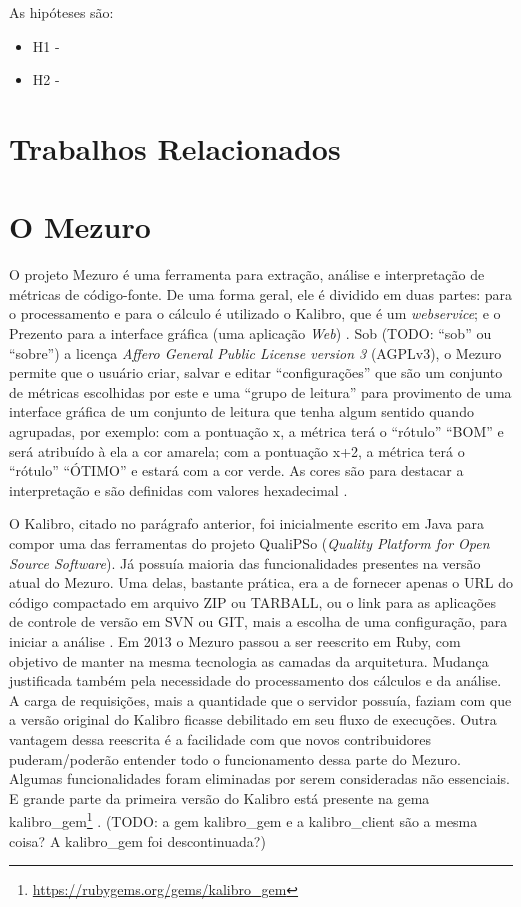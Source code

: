 As hipóteses são:

\begin{itemize}
  \item H1 - 
  \item H2 - 
\end{itemize}


\section{Trabalhos Relacionados}

\section{O Mezuro}

O projeto Mezuro é uma ferramenta para extração, análise e interpretação de
métricas de código-fonte. De uma forma geral, ele é dividido em duas partes:
para o processamento e para o cálculo é utilizado o Kalibro, que é um
\textit{webservice}; e o Prezento para a interface gráfica (uma aplicação
\textit{Web}) \cite{meirellesCibse2015}. Sob (TODO: ``sob'' ou ``sobre'') a licença
\textit{Affero General Public License version 3} (AGPLv3), o Mezuro permite que
o usuário criar, salvar e editar ``configurações'' que são um conjunto de
métricas escolhidas por este e uma ``grupo de leitura'' para provimento de uma
interface gráfica de um conjunto de leitura que tenha algum sentido quando
agrupadas, por exemplo: com a pontuação x, a métrica terá o ``rótulo'' ``BOM'' e
será atribuído à ela a cor amarela; com a pontuação x+2, a métrica terá o 
``rótulo'' ``ÓTIMO'' e estará com a cor verde. As cores são para destacar a
interpretação e são definidas com valores hexadecimal \cite{camarinhaOSS2015}.

O Kalibro, citado no parágrafo anterior, foi inicialmente escrito em Java para
compor uma das ferramentas do projeto QualiPSo (\textit{Quality Platform for
Open Source Software}). Já possuía maioria das funcionalidades presentes na
versão atual do Mezuro. Uma delas, bastante prática, era a de fornecer apenas o
URL do código compactado em arquivo ZIP ou TARBALL, ou o link para as
aplicações de controle de versão em SVN ou GIT, mais a escolha de uma
configuração, para iniciar a análise \cite{camarinhaOSS2015}. Em 2013 o Mezuro
passou a ser reescrito em Ruby, com objetivo de manter na mesma tecnologia as
camadas da arquitetura. Mudança justificada também pela necessidade do
processamento dos cálculos e da análise. A carga de requisições, mais a
quantidade que o servidor possuía, faziam com que a versão original do Kalibro
ficasse debilitado em seu fluxo de execuções. Outra vantagem dessa reescrita é
a facilidade com que novos contribuidores puderam/poderão entender todo o
funcionamento dessa parte do Mezuro. Algumas funcionalidades foram eliminadas
por serem consideradas não essenciais. E grande parte da primeira versão do
Kalibro está presente na gema kalibro\_gem\footnote{\url{https://rubygems.org/gems/kalibro_gem}}
\cite{meirellesCibse2015}.
(TODO: a gem kalibro\_gem e a kalibro\_client são a mesma coisa? A kalibro\_gem
foi descontinuada?)

